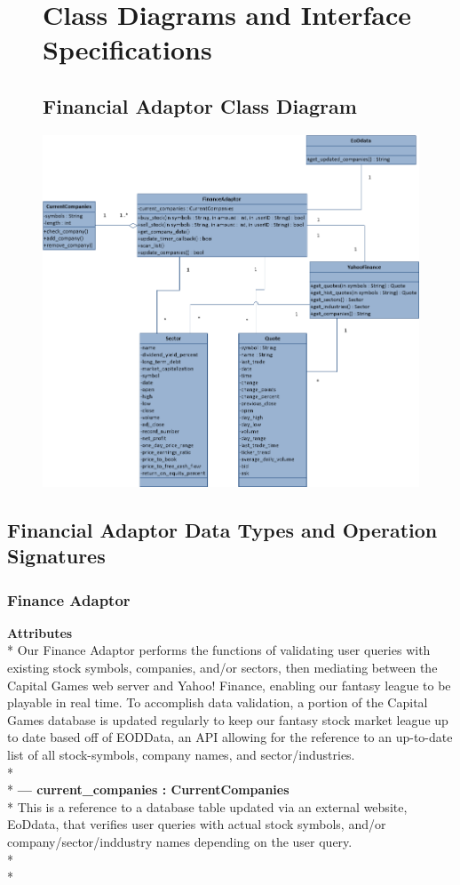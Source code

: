 \begin{figure}
\chapter{Class Diagrams and Interface Specifications}
\section{Financial Adaptor Class Diagram}
\centering
\includegraphics[width=5.5in]{./Diagrams/DomainModel/Financialdomainmodel.png}
\end{figure}

\clearpage

\section{Financial Adaptor Data Types and Operation Signatures}
\subsection{Finance Adaptor}
{\bfseries Attributes} \\*
Our Finance Adaptor performs the functions of validating user queries with 
existing stock symbols, companies, and/or sectors, then mediating between
the Capital Games web server and Yahoo! Finance, enabling our fantasy league
to be playable in real time.  To accomplish data validation, a portion of the
Capital Games database is updated regularly to keep our fantasy stock market
league up to date based off of EODData, an API allowing for the reference to
an up-to-date list of all stock-symbols, company names, and sector/industries. \\* \\*
{\bfseries --- current\_companies : CurrentCompanies } \\*
	This is a reference to a database table updated via an external website, EoDdata,
	that verifies user queries with actual stock symbols, and/or 
	company/sector/inddustry names depending on the user query. \\*\\*

